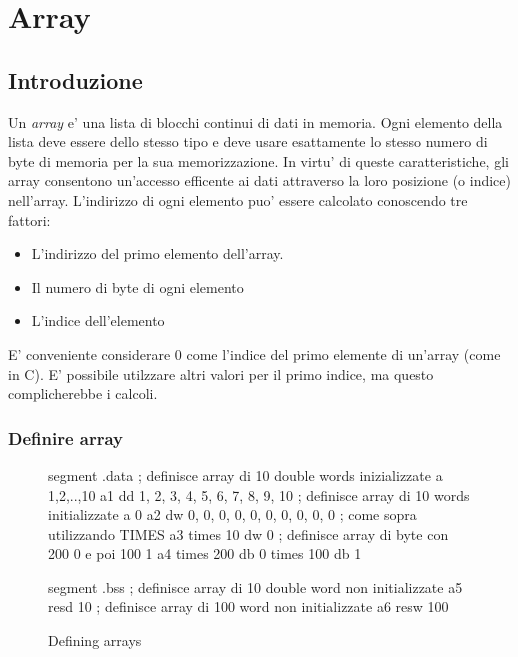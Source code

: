 \chapter{Array}
\section{Introduzione}

Un \emph{array} e' una lista di blocchi continui di dati in memoria. Ogni elemento
della lista deve essere dello stesso tipo e deve usare esattamente lo stesso
numero di byte di memoria per la sua memorizzazione. In virtu' di queste 
caratteristiche, gli array consentono un'accesso efficente ai dati attraverso
la loro posizione (o indice) nell'array. L'indirizzo di ogni elemento puo'
essere calcolato conoscendo tre fattori:
\begin{itemize}
\item L'indirizzo del primo elemento dell'array.
\item Il numero di byte di ogni elemento
\item L'indice dell'elemento
\end{itemize}

E' conveniente considerare 0 come l'indice del primo elemente di un'array
(come in C). E' possibile utilzzare altri valori per il primo indice, ma
questo complicherebbe i calcoli. 

\subsection{Definire array}

\begin{figure}[t]
\begin{AsmCodeListing}[frame=single]
segment .data
; definisce array di 10 double words inizializzate a 1,2,..,10
a1           dd   1, 2, 3, 4, 5, 6, 7, 8, 9, 10
; definisce array di 10 words initializzate a 0
a2           dw   0, 0, 0, 0, 0, 0, 0, 0, 0, 0
; come sopra utilizzando TIMES
a3           times 10 dw 0
; definisce array di byte con 200 0 e poi 100 1
a4           times 200 db 0
             times 100 db 1

segment .bss
; definisce array di 10 double word non initializzate
a5           resd  10
; definisce array di 100 word non initializzate
a6           resw  100
\end{AsmCodeListing}
\caption{Defining arrays\label{fig:DataArrays}}
\end{figure}

